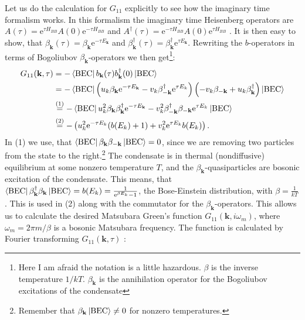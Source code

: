 Let us do the calculation for $G_{11}$ explicitly to see how the imaginary time formalism works. In this formalism the imaginary time Heisenberg operators are $A(\tau) = \text{e}^{\tau H_{BB}}A(0)\text{e}^{-\tau H_{BB}}$ and $A^\dagger(\tau) = \text{e}^{-\tau H_{BB}}A(0)\text{e}^{\tau H_{BB}}$ \cite{BruusFlensberg}. It is then easy to show, that $\beta_\mathbf{k}(\tau) = \beta_\mathbf{k}\text{e}^{-\tau E_\mathbf{k}}$ and $\beta^\dagger_\mathbf{k}(\tau) = \beta^\dagger_\mathbf{k}\text{e}^{\tau E_\mathbf{k}}$. Rewriting the $b$-operators in terms of Bogoliubov $\beta_\mathbf{k}$-operators we then get\footnote{Here I am afraid the notation is a little hazardous. $\beta$ is the inverse temperature $1/kT$. $\beta_\mathbf{k}$ is the annihilation operator for the Bogoliubov excitations of the condensate}:
\begin{align}
G_{11}(\mathbf{k},\tau) &= -\bra{\text{BEC}} b_\mathbf{k}(\tau)b_\mathbf{k}^\dagger(0)\ket{\text{BEC}} \nonumber \\
&= -\bra{\text{BEC}} \left(u_k\beta_\mathbf{k}\text{e}^{-\tau E_\mathbf{k}} - v_k \beta^\dagger_{-\mathbf{k}}\text{e}^{\tau E_k} \right)\left( -v_k\beta_{-\mathbf{k}} + u_k \beta^\dagger_{\mathbf{k}} \right)\ket{\text{BEC}} \nonumber \\
&\overset{(1)}{=} -\bra{\text{BEC}} u_k^2\beta_\mathbf{k}\beta^\dagger_\mathbf{k}\text{e}^{-\tau E_\mathbf{k}} - v_k^2 \beta^\dagger_{-\mathbf{k}}\beta_{-\mathbf{k}}\text{e}^{\tau E_k} \ket{\text{BEC}} \nonumber \\
&\overset{(2)}{=} -\left(u_k^2 \text{e}^{-\tau E_k}(b(E_k)+1)+ v_k^2\text{e}^{\tau E_k}b(E_k)\right). \nonumber
\end{align}
In (1) we use, that $\bra{\text{BEC}}\beta_\mathbf{k}\beta_{-\mathbf{k}}\ket{\text{BEC}} = 0$, since we are removing two particles from the state to the right.\footnote{Remember that $\beta_\mathbf{k}\ket{\text{BEC}} \neq 0$ for nonzero temperatures.} The condensate is in thermal (nondiffusive) equilibrium at some nonzero temperature $T$, and the $\beta_\mathbf{k}$-quasiparticles are bosonic excitation of the condensate. This means, that $\bra{\text{BEC}}\beta_\mathbf{k}^\dagger\beta_{\mathbf{k}}\ket{\text{BEC}} = b(E_k) = \frac{1}{\text{e}^{\beta E_k}-1}$, the Bose-Einstein distribution, with $\beta = \frac{1}{kT}$. This is used in (2) along with the commutator for the $\beta_\mathbf{k}$-operators. This allows us to calculate the desired Matsubara Green's function $G_{11}(\mathbf{k},i\omega_m)$, where $\omega_m = 2\pi m/\beta$ is a bosonic Matsubara frequency. The function is calculated by Fourier transforming $G_{11}(\mathbf{k},\tau)$ \cite{BruusFlensberg}: 
